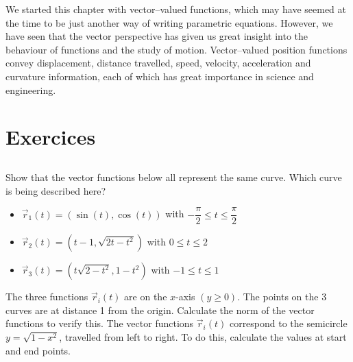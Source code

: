 We started this chapter with vector--valued functions, which may have seemed at the time to be just another way of writing parametric equations. However, we have seen that the vector perspective has given us great insight into the behaviour of functions and the study of motion. Vector--valued position functions convey displacement, distance travelled, speed, velocity, acceleration and curvature information, each of which has great importance in science and engineering.


\newpage
\section{Exercices}
\renewcommand{\ExerciseListName}{Assignement}

\subsection*{}
\ifanalysis\begin{Exercise}[difficulty = 1]\fi\ifcalculus\begin{Exercise}[difficulty = 2]\fi Show that the vector functions below all represent the same curve. Which curve is being described here? 
\begin{itemize}
        \item [] $\vec r_1(t) = \left(\sin (t), \cos (t)\right)$ \qquad with \quad $-\dfrac{\pi}{2} \leq t \leq \dfrac{\pi}{2} $
        \item [] $\vec r_2(t) = \left( t-1, \sqrt{2t - t^2} \right) $ \qquad with \quad $0 \leq t \leq 2 $
        \item [] $\vec r_3(t) = \left( t\sqrt{2 - t^2}, 1-t^2 \right) $ \qquad with \quad $-1 \leq t \leq 1 $
\end{itemize}

\ifanalysis\end{Exercise}\fi\ifcalculus\end{Exercise}\fi
{}
\begin{Answer}
    The three functions $\vec r_i (t)$ are on the $x$-axis $(y\geq 0)$. The points on the 3 curves are at distance 1 from the origin. Calculate the norm of the vector functions to verify this. The vector functions $\vec r_i (t)$ correspond to the semicircle $y = \sqrt{1-x^2}$, travelled from left to right. To do this, calculate the values at start and end points.
\end{Answer}

